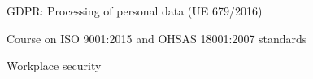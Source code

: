 \begin{cventries}
   \cventry
    {}
    {}
    {}
    {}
    {
      \begin{cvitems}
        \item {GDPR: Processing of personal data (UE 679/2016)}
        \item{Course on ISO 9001:2015 and OHSAS 18001:2007 standards}
        \item{Workplace security}
      \end{cvitems}
    }
\end{cventries}